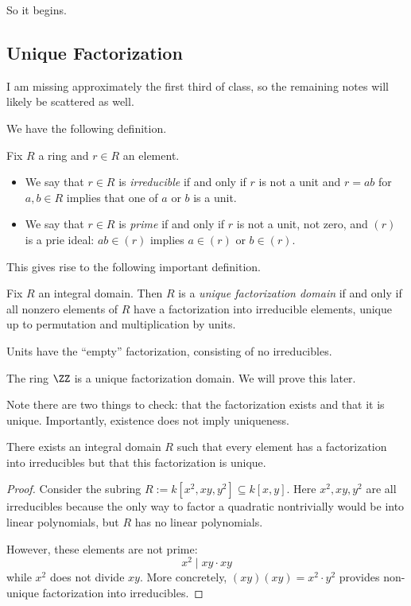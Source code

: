 







So it begins.

\subsection{Unique Factorization}
\begin{warn}
	I am missing approximately the first third of class, so the remaining notes will likely be scattered as well.
\end{warn}
We have the following definition.
\begin{definition}
	Fix $R$ a ring and $r\in R$ an element.
	\begin{itemize}
		\item We say that $r\in R$ is \textit{irreducible} if and only if $r$ is not a unit and $r=ab$ for $a,b\in R$ implies that one of $a$ or $b$ is a unit.
		\item We say that $r\in R$ is \textit{prime} if and only if $r$ is not a unit, not zero, and $(r)$ is a prie ideal: $ab\in(r)$ implies $a\in(r)$ or $b\in(r)$.
	\end{itemize}
\end{definition}
This gives rise to the following important definition.
\begin{definition}
	Fix $R$ an integral domain. Then $R$ is a \textit{unique factorization domain} if and only if all nonzero elements of $R$ have a factorization into irreducible elements, unique up to permutation and multiplication by units.
\end{definition}
\begin{remark}
	Units have the ``empty'' factorization, consisting of no irreducibles.
\end{remark}
\begin{example}
	The ring $\ZZ$ is a unique factorization domain. We will prove this later.
\end{example}
Note there are two things to check: that the factorization exists and that it is unique. Importantly, existence does not imply uniqueness.
\begin{exe}
	There exists an integral domain $R$ such that every element has a factorization into irreducibles but that this factorization is unique.
\end{exe}
\begin{proof}
	Consider the subring $R:=k\left[x^2,xy,y^2\right]\subseteq k[x,y]$. Here $x^2,xy,y^2$ are all irreducibles because the only way to factor a quadratic nontrivially would be into linear polynomials, but $R$ has no linear polynomials.
	
	However, these elements are not prime:
	\[x^2\mid xy\cdot xy\]
	while $x^2$ does not divide $xy$. More concretely, $(xy)(xy)=x^2\cdot y^2$ provides non-unique factorization into irreducibles.
\end{proof}
